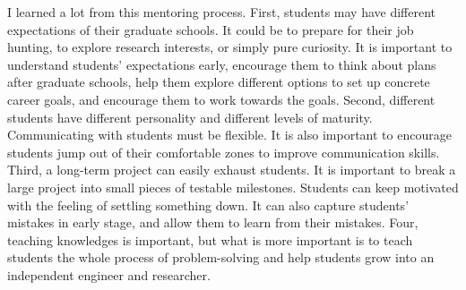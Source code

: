 \documentclass[10pt]{article}
\begin{document}
I learned a lot from this mentoring process. 
First, students may have different expectations of their graduate schools. 
It could be to prepare for their job hunting, to explore research interests, or simply pure curiosity. 
It is important to understand students' expectations early, encourage them to think about plans after graduate schools, 
help them explore different options to set up concrete career goals, 
and encourage them to work towards the goals. 
Second, different students have different personality and different levels of maturity.
Communicating with students must be flexible. 
It is also important to encourage students jump out of their comfortable zones to improve communication skills. 
Third, a long-term project can easily exhaust students. 
It is important to break a large project into small pieces of testable milestones. 
Students can keep motivated with the feeling of settling something down.
It can also capture students' mistakes in early stage, and allow them to learn from their mistakes.  
Four, teaching knowledges is important, but what is more important is to teach students 
the whole process of problem-solving and 
help students grow into an independent engineer and researcher. 



%
%
\end{document}
